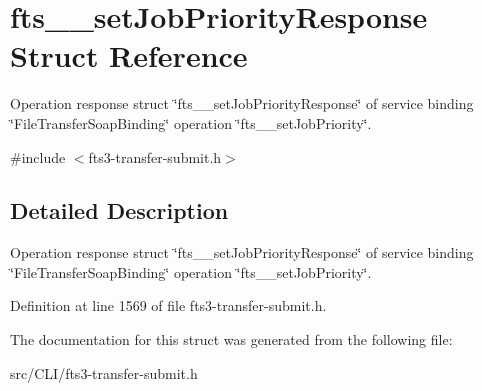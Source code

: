 \section{fts\_\-\_\-setJobPriorityResponse Struct Reference}
\label{structfts____setJobPriorityResponse}


Operation response struct \char`\"{}fts\_\-\_\-setJobPriorityResponse\char`\"{} of service binding \char`\"{}FileTransferSoapBinding\char`\"{} operation \char`\"{}fts\_\-\_\-setJobPriority\char`\"{}.  




{\ttfamily \#include $<$fts3-\/transfer-\/submit.h$>$}



\subsection{Detailed Description}
Operation response struct \char`\"{}fts\_\-\_\-setJobPriorityResponse\char`\"{} of service binding \char`\"{}FileTransferSoapBinding\char`\"{} operation \char`\"{}fts\_\-\_\-setJobPriority\char`\"{}. 

Definition at line 1569 of file fts3-\/transfer-\/submit.h.



The documentation for this struct was generated from the following file:\begin{DoxyCompactItemize}
\item 
src/CLI/fts3-\/transfer-\/submit.h\end{DoxyCompactItemize}
